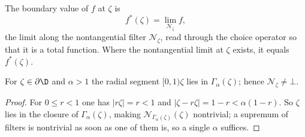\begin{definition}
  \label{def:boundary_function}
  \leanok
  The boundary value of $f$ at $\zeta$ is
  \[
    f^*(\zeta)=\lim_{\mathcal{N}_\zeta}f,
  \]
  the limit along the nontangential filter $\mathcal{N}_\zeta$, read through the
  choice operator so that it is a total function. Where the nontangential limit
  at $\zeta$ exists, it equals $f^*(\zeta)$.
\end{definition}

\begin{lemma}
  \label{lem:nt_filter_neBot}
  \leanok
  For $\zeta\in\partial\D$ and $\alpha>1$ the radial segment $[0,1)\zeta$ lies in
  $\Gamma_\alpha(\zeta)$; hence $\mathcal{N}_\zeta\neq\bot$.
  \begin{proof}
    \leanok
    For $0\le r<1$ one has $|r\zeta|=r<1$ and
    $|\zeta-r\zeta|=1-r<\alpha(1-r)$. So $\zeta$ lies in the closure of
    $\Gamma_\alpha(\zeta)$, making $\mathcal{N}_{\Gamma_\alpha(\zeta)}(\zeta)$
    nontrivial; a supremum of filters is nontrivial as soon as one of them is,
    so a single $\alpha$ suffices.
  \end{proof}
\end{lemma}

